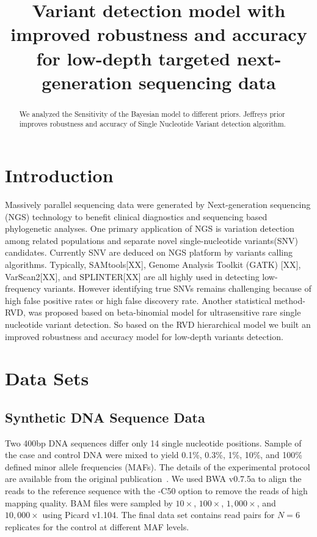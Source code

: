 \documentclass[11pt,reqno]{amsart}
\title[RVD3]{Variant detection model with improved robustness and accuracy for low-depth targeted next-generation sequencing data}
\author{}
\begin{document}
\begin{abstract}

We analyzed the Sensitivity of the Bayesian model to different priors. Jeffreys prior improves robustness and accuracy of Single Nucleotide Variant detection algorithm.

\end{abstract}

\maketitle

\section{Introduction}

Massively parallel sequencing data were generated by Next-generation sequencing (NGS) technology to benefit clinical diagnostics and sequencing based phylogenetic analyses. One primary application of NGS is variation detection among related populations and separate novel single-nucleotide variants(SNV) candidates.
Currently SNV are deduced on NGS platform by variants calling algorithms. Typically, SAMtools[XX], Genome Analysis Toolkit (GATK) [XX], VarScan2[XX], and SPLINTER[XX] are all highly used in detecting low-frequency variants. However identifying true SNVs remains challenging because of high false positive rates or high false discovery rate. Another statistical method-RVD, was proposed based on beta-binomial model for ultrasensitive rare single nucleotide variant detection. So based on the RVD hierarchical model we built an improved robustness and accuracy model for low-depth variants detection.


\section{Data Sets}

\subsection{Synthetic DNA Sequence Data}

Two 400bp DNA sequences differ only 14 single nucleotide positions. Sample of the case and control DNA were mixed to yield 0.1\%, 0.3\%, 1\%, 10\%, and 100\% defined minor allele frequencies (MAFs). The details of the experimental protocol are available from the original publication~\citep{Flaherty:2011ja}. We used BWA v0.7.5a to align the reads to the reference sequence with the -C50 option to remove the reads of high mapping quality. BAM files were sampled by $10\times$, $100\times$, $1,000\times$, and $10,000\times$ using Picard v1.104. The final data set contains read pairs for $N=6$ replicates for the control at different MAF levels.
\end{document}
